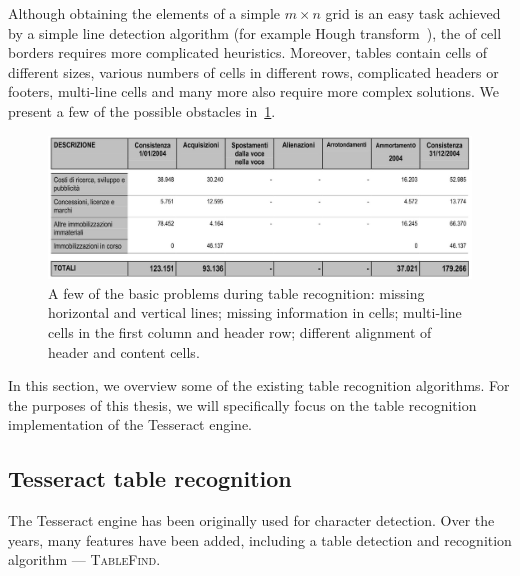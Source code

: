  Although obtaining the elements of a simple $m{\times}n$ grid is an easy task achieved by a simple line detection algorithm (for example Hough transform~\cite{houghTransform}), the  of cell borders requires more complicated heuristics. Moreover, tables contain cells of different sizes, various numbers of cells in different rows, complicated headers or footers, multi-line cells and many more also require more complex solutions. We present a few of the possible obstacles in~\cref{fig:tableRecognitionObstacles}.

\begin{figure}[t]
\centering
\includegraphics[width=0.7\linewidth]{img/tableDetection/recognitionProblematic.jpg}
\caption{A few of the basic problems during table recognition: missing horizontal and vertical lines; missing information in cells; multi-line cells in the first column and header row; different alignment of header and content cells.}
\label{fig:tableRecognitionObstacles}
\end{figure}

In this section, we overview some of the  existing table recognition algorithms. For the purposes of this thesis, we will specifically focus on the table recognition implementation of the Tesseract engine.

\subsection{Tesseract table recognition} \label{tableFind}

The Tesseract engine has been originally used  for character detection. Over the years,  many features have been added, including a table detection and recognition algorithm --- \textsc{TableFind}. 

